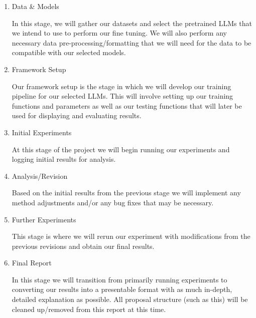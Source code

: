 \begin{enumerate}
    \item Data \& Models

    In this stage, we will gather our datasets and select the pretrained LLMs that we intend to use to perform our fine tuning. We will also perform any necessary data pre-processing/formatting that we will need for the data to be compatible with our selected models.
    
    \item Framework Setup

    Our framework setup is the stage in which we will develop our training pipeline for our selected LLMs. This will involve setting up our training functions and parameters as well as our testing functions that will later be used for displaying and evaluating results.
    
    \item Initial Experiments

    At this stage of the project we will begin running our experiments and logging initial results for analysis.
    
    \item Analysis/Revision

    Based on the initial results from the previous stage we will implement any method adjustments and/or any bug fixes that may be necessary. 
    
    \item Further Experiments

    This stage is where we will rerun our experiment with modifications from the previous revisions and obtain our final results.
    
    \item Final Report

    In this stage we will transition from primarily running experiments to converting our results into a presentable format with as much in-depth, detailed explanation as possible. All proposal structure (such as this) will be cleaned up/removed from this report at this time.
\end{enumerate}
